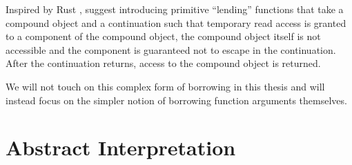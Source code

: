 Inspired by Rust \citep{weiss_oxide_2021}, \citep{spiwack_linearly_2022} suggest introducing primitive ``lending'' functions that take a compound object and a continuation such that temporary read access is granted to a component of the compound object, the compound object itself is not accessible and the component is guaranteed not to escape in the continuation. After the continuation returns, access to the compound object is returned. 

We will not touch on this complex form of borrowing in this thesis and will instead focus on the simpler notion of borrowing function arguments themselves.

\section{Abstract Interpretation}